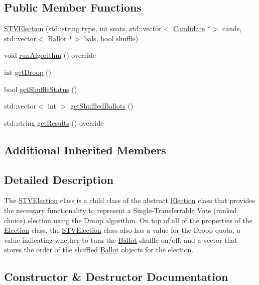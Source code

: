 \subsection*{Public Member Functions}
\begin{DoxyCompactItemize}
\item 
\hyperlink{classSTVElection_a7869d492ef2d932bd9439516f4252b75}{S\+T\+V\+Election} (std\+::string type, int seats, std\+::vector$<$ \hyperlink{classCandidate}{Candidate} $\ast$$>$ cands, std\+::vector$<$ \hyperlink{classBallot}{Ballot} $\ast$$>$ bals, bool shuffle)
\item 
void \hyperlink{classSTVElection_ac4e0339e3cb97add1a22c9af7233df17}{run\+Algorithm} () override
\item 
int \hyperlink{classSTVElection_a0f8e2dea0af2ecea795a79c6e0e63fe2}{get\+Droop} ()
\item 
bool \hyperlink{classSTVElection_aa8597739fd9823bbe8ea5a7fdb741f53}{get\+Shuffle\+Status} ()
\item 
std\+::vector$<$ int $>$ \hyperlink{classSTVElection_a89e835eb11707dcba9f22a84c1d532f1}{get\+Shuffled\+Ballots} ()
\item 
std\+::string \hyperlink{classSTVElection_ae7efa73091c87add327d71ff5f943c3c}{get\+Results} () override
\end{DoxyCompactItemize}
\subsection*{Additional Inherited Members}


\subsection{Detailed Description}
The \hyperlink{classSTVElection}{S\+T\+V\+Election} class is a child class of the abstract \hyperlink{classElection}{Election} class that provides the necessary functionality to represent a Single-\/\+Transferrable Vote (ranked choice) election using the Droop algorithm. On top of all of the properties of the \hyperlink{classElection}{Election} class, the \hyperlink{classSTVElection}{S\+T\+V\+Election} class also has a value for the Droop quota, a value indicating whether to turn the \hyperlink{classBallot}{Ballot} shuffle on/off, and a vector that stores the order of the shuffled \hyperlink{classBallot}{Ballot} objects for the election. 

\subsection{Constructor \& Destructor Documentation}
\mbox{\label{classSTVElection_a7869d492ef2d932bd9439516f4252b75}} 
